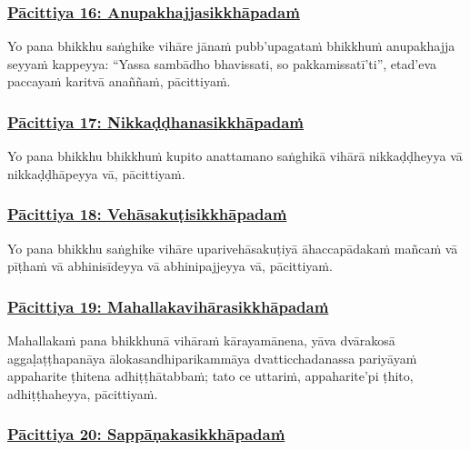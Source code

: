 \subsubsection*{\hyperref[exp16]{Pācittiya 16: Anupakhajjasikkhāpadaṁ}}
\label{pac16}

Yo pana bhikkhu saṅghike vihāre jānaṁ pubb'upagataṁ bhikkhuṁ anupakhajja seyyaṁ kappeyya: ``Yassa sambādho bhavissati, so pakkamissatī'ti'', etad'eva paccayaṁ karitvā anaññaṁ, pācittiyaṁ.



\subsubsection*{\hyperref[exp17]{Pācittiya 17: Nikkaḍḍhanasikkhāpadaṁ}}
\label{pac17}

Yo pana bhikkhu bhikkhuṁ kupito anattamano saṅghikā vihārā nikkaḍḍheyya vā nikkaḍḍhāpeyya vā, pācittiyaṁ.



\subsubsection*{\hyperref[exp18]{Pācittiya 18: Vehāsakuṭisikkhāpadaṁ}}
\label{pac18}

Yo pana bhikkhu saṅghike vihāre uparivehāsakuṭiyā āhaccapādakaṁ mañcaṁ vā pīṭhaṁ vā abhinisīdeyya vā abhinipajjeyya vā, pācittiyaṁ.



\subsubsection*{\hyperref[exp19]{Pācittiya 19: Mahallakavihārasikkhāpadaṁ}}
\label{pac19}

Mahallakaṁ pana bhikkhunā vihāraṁ kārayamānena, yāva dvārakosā aggaḷaṭṭhapanāya ālokasandhiparikammāya dvatticchadanassa pariyāyaṁ appaharite ṭhitena adhiṭṭhātabbaṁ; tato ce uttariṁ, appaharite'pi ṭhito, adhiṭṭhaheyya, pācittiyaṁ.



\subsubsection*{\hyperref[exp20]{Pācittiya 20: Sappāṇakasikkhāpadaṁ}}
\label{pac20}

